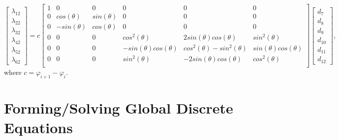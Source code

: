\documentclass[11pt]{article}  %
\begin{document}
\begin{equation} 
\left[
 \begin{array}{c}
 \lambda_{12} \\
 \lambda_{22} \\
 \lambda_{32} \\
 \lambda_{42}\\
 \lambda_{52}\\
 \lambda_{62}
 \end{array} \right]
=c\left[
 \begin{array}{cccccc}
 1 & 0 & 0 & 0 & 0 & 0 \\
 0 & cos(\theta) & sin(\theta) & 0 & 0 &0 \\
 0 & -sin(\theta) & cos(\theta) & 0 & 0 &0 \\
 0 & 0 & 0 & cos^2(\theta) & 2sin(\theta)cos(\theta) & sin^2(\theta) \\
 0 & 0 & 0 & -sin(\theta)cos(\theta) & cos^2(\theta)-sin^2(\theta) & sin(\theta)cos(\theta) \\
 0 & 0 & 0 & sin^2(\theta) & -2sin(\theta)cos(\theta) & cos^2(\theta) \\ 
 \end{array}
 \right]
 \left[
 \begin{array}{c}
 d_{7} \\
 d_{8} \\
 d_{9} \\
 d_{10}\\
 d_{11}\\
 d_{12}
 \end{array} \right],
\end{equation}
where $c=\varphi_{i+1}-\varphi_{i}$.

\section{Forming/Solving Global Discrete Equations} \label{sec:form-eq}


\end{document}
